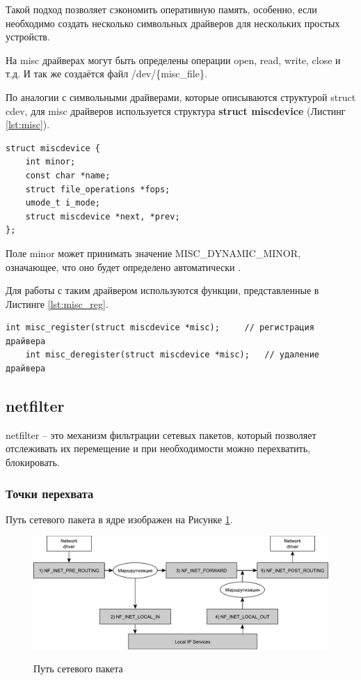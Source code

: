 Такой подход позволяет сэкономить оперативную память, особенно, если необходимо создать несколько символьных драйверов для нескольких простых устройств.

На misc драйверах могут быть определены операции open, read, write, close и т.д. И так же создаётся файл /dev/\{misc\_file\}.

По аналогии с символьными драйверами, которые описываются структурой struct cdev, для misc драйверов используется структура \textbf{struct miscdevice} (Листинг \ref{lst:misc}).
\begin{lstlisting}[caption = {struct miscdevice}, label=lst:misc]
struct miscdevice {
	int minor;
	const char *name;
	struct file_operations *fops;
	umode_t i_mode;
	struct miscdevice *next, *prev;
};
\end{lstlisting}

Поле minor может принимать значение MISC\_DYNAMIC\_MINOR, означающее, что оно будет определено автоматически \cite{3d}.

Для работы с таким драйвером используются функции, представленные в Листинге \ref{lst:misc_reg}.
\begin{lstlisting}[caption = {Функции для регистрации и удаления misc драйвера}, label=lst:misc_reg]
	int misc_register(struct miscdevice *misc);		// регистрация драйвера
	int misc_deregister(struct miscdevice *misc);	// удаление драйвера
\end{lstlisting}

\subsection{netfilter}
netfilter -- это механизм фильтрации сетевых пакетов, который позволяет отслеживать их перемещение и при необходимости можно перехватить, блокировать. \cite{hook} \newline

\subsubsection{Точки перехвата}
Путь сетевого пакета в ядре изображен на Рисунке \ref{fig2:image}. \\

\begin{figure}[ph!]
	\centering
	\begin{center}
		{\includegraphics[scale=0.6]{img/packets.pdf}}
		\caption{Путь сетевого пакета}
		\label{fig2:image}
	\end{center}
\end{figure}

